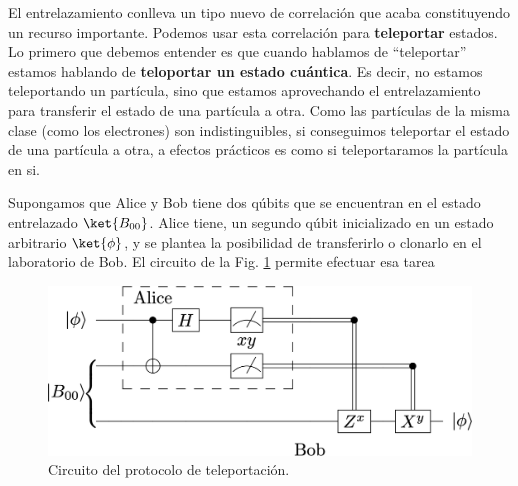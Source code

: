 \documentclass[a4paper,11pt]{book} %
\numberwithin{equation}{chapter}
\begin{document}
El entrelazamiento conlleva un tipo  nuevo de correlación que acaba constituyendo un recurso importante.  Podemos usar esta correlación para \textbf{teleportar} estados. Lo primero que debemos entender es que cuando hablamos de ``teleportar'' estamos hablando de \textbf{teloportar un estado cuántica}. Es decir, no estamos teleportando un partícula, sino que estamos aprovechando el entrelazamiento para transferir el estado de una partícula a otra. Como las partículas de la misma clase (como los electrones) son indistinguibles, si conseguimos teleportar  el estado de una partícula a otra, a efectos prácticos es como si teleportaramos la partícula en si. 

       
Supongamos que Alice y Bob tiene dos qúbits que se encuentran en el estado entrelazado $\ket{B_{00}}$.  Alice tiene, un segundo qúbit inicializado en un estado arbitrario $\ket{\phi}$, y se plantea la posibilidad de transferirlo o clonarlo en el laboratorio de Bob. El circuito de la Fig. \ref{Fig_entrelazamiento_teleportacion} permite efectuar esa tarea

	\begin{figure}[H]
	\centering 
	\includegraphics[width=0.45\linewidth]{Figuras/Fig_entrelazamiento_teleportacion}
	\caption{Circuito del protocolo de teleportación.}
	\label{Fig_entrelazamiento_teleportacion}
	\end{figure}
\end{document}
